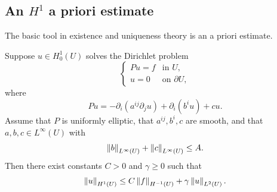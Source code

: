 \subsection{An $H^1$ a priori estimate}

The basic tool in existence and uniqueness theory is an a priori estimate.

\begin{theorem}
Suppose $u\in H_0^1(U)$ solves the Dirichlet problem
\[
\begin{cases}
Pu = f & \text{in }U,\\
u = 0 & \text{on }\partial U,
\end{cases}
\]
where
\[
Pu = -\partial_i(a^{ij}\partial_j u) + \partial_i(b^i u) + cu.
\]
Assume that $P$ is uniformly elliptic, that $a^{ij},b^i,c$ are smooth, and that $a,b,c\in L^\infty(U)$ with
\[
\left\lVert b \right\rVert_{L^\infty(U)} + \left\lVert c \right\rVert_{L^\infty(U)} \leq A.
\]
Then there exist constants $C>0$ and $\gamma\geq 0$ such that
\[
\left\lVert u \right\rVert_{H^1(U)} \leq C\left\lVert f \right\rVert_{H^{-1}(U)} + \gamma \left\lVert u \right\rVert_{L^2(U)}.
\]
\end{theorem}
